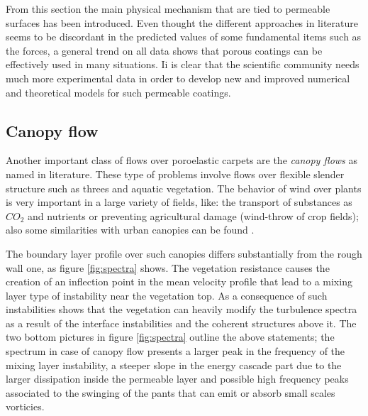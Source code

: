 From this section the main physical mechanism that are tied to permeable surfaces has been introduced.
Even thought the different approaches in literature seems to be discordant in the predicted values of some fundamental items such as the forces, a general trend on all  data shows that porous coatings can be effectively used in many situations.
Ii is clear that the scientific community needs much more experimental data in order to develop new and improved numerical and theoretical models for such permeable coatings.

\subsection{Canopy flow}

Another important class of flows over poroelastic carpets are the \textit{canopy flows} as named in literature.
These type of problems involve flows over flexible slender structure such as threes and aquatic vegetation.
The behavior of wind over plants is very important in a large variety of fields, like: the transport of substances as $CO_2$ and nutrients or preventing agricultural damage (wind-throw of crop fields); also some similarities with urban canopies can be found \citet{ghisalberti2009obstructed}.

The boundary layer profile over such canopies differs substantially from the rough wall one, as figure \ref{fig:spectra} shows.
The vegetation resistance causes the creation of an inflection point in the mean velocity profile that lead to a mixing layer type of instability near the vegetation top.
As a consequence of such instabilities \citet{finnigan2000turbulence} shows that the vegetation can heavily modify the turbulence spectra as a result of the interface instabilities and the coherent structures above it.
The two bottom pictures in figure \ref{fig:spectra} outline the above statements; the spectrum in case of canopy flow presents a larger peak in the frequency of the mixing layer instability, a steeper slope in the energy cascade part due to the larger dissipation inside the permeable layer and possible high frequency peaks associated to the swinging of the pants that can emit or absorb small scales vorticies.
 
